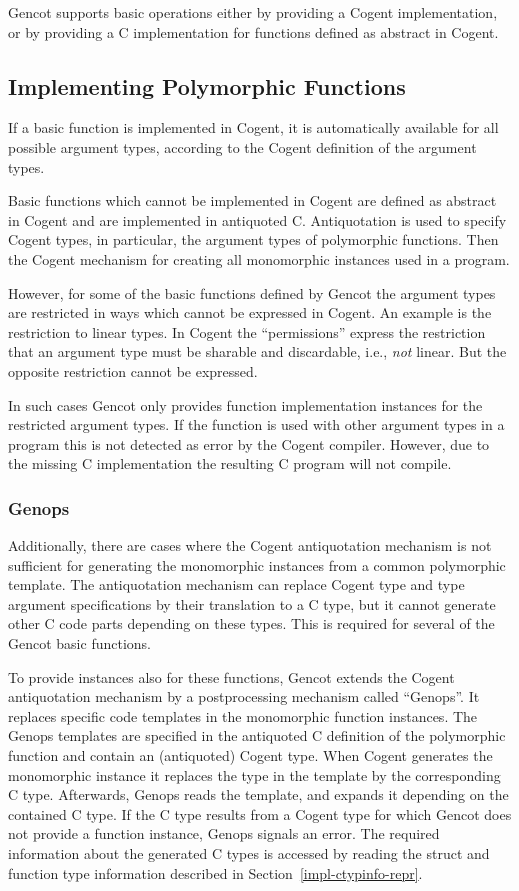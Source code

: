 Gencot supports basic operations either by providing a Cogent implementation, or by providing
a C implementation for functions defined as abstract in Cogent.

\subsection{Implementing Polymorphic Functions}
\label{impl-operations-poly}

If a basic function is implemented in Cogent, it is automatically available for all possible argument types, according
to the Cogent definition of the argument types. 

Basic functions which cannot be implemented in Cogent are defined as abstract in Cogent and are implemented in
antiquoted C. Antiquotation is used to specify Cogent types, in particular, the argument types of polymorphic
functions. Then the Cogent mechanism for creating all monomorphic instances used in a program.

However, for some of the basic functions defined by Gencot the argument types are restricted in ways which cannot
be expressed in Cogent. An example is the restriction to linear types. In Cogent the ``permissions''  express 
the restriction that an argument type must be sharable and discardable, i.e., \textit{not} linear. But the opposite
restriction cannot be expressed. 

In such cases Gencot only provides function implementation instances for the restricted argument types. If the function
is used with other argument types in a program this is not detected as error by the Cogent compiler. However, due to 
the missing C implementation the resulting C program will not compile.

\subsubsection{Genops}

Additionally, there are cases where the Cogent antiquotation mechanism is not sufficient for generating the 
monomorphic instances from a common polymorphic template. The antiquotation mechanism can replace Cogent type
and type argument specifications by their translation to a C type, but it cannot generate other C code parts 
depending on these types. This is required for several of the Gencot basic functions.

To provide instances also for these functions, Gencot extends the Cogent antiquotation mechanism by a postprocessing
mechanism called ``Genops''. It replaces specific code templates in the monomorphic function instances. The Genops
templates are specified in the antiquoted C definition of the polymorphic function and contain an (antiquoted) 
Cogent type. When Cogent generates the monomorphic instance it replaces the type in the template by the 
corresponding C type. Afterwards, Genops reads the template, and expands it depending on the contained C type. 
If the C type results from a Cogent type for which Gencot does not provide a function instance, Genops signals
an error. The required information about the generated C types is accessed by reading the struct and function type
information described in Section~\ref{impl-ctypinfo-repr}.

